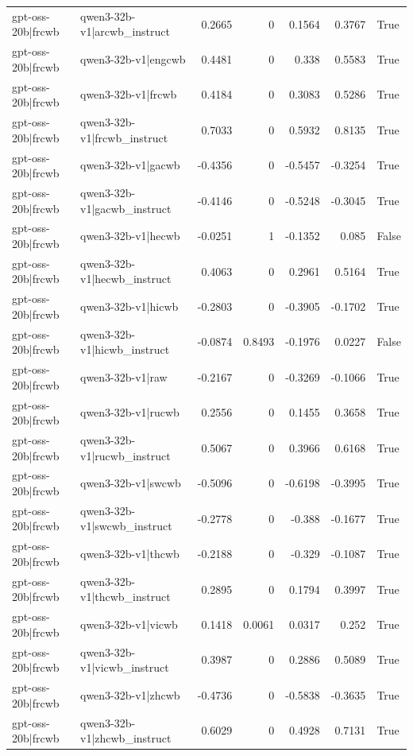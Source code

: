 \begin{table}
\begin{tabular}{l l r r r r l}
gpt-oss-20b|frcwb & qwen3-32b-v1|arcwb_instruct & 0.2665 & 0 & 0.1564 & 0.3767 & True \\
gpt-oss-20b|frcwb & qwen3-32b-v1|engcwb & 0.4481 & 0 & 0.338 & 0.5583 & True \\
gpt-oss-20b|frcwb & qwen3-32b-v1|frcwb & 0.4184 & 0 & 0.3083 & 0.5286 & True \\
gpt-oss-20b|frcwb & qwen3-32b-v1|frcwb_instruct & 0.7033 & 0 & 0.5932 & 0.8135 & True \\
gpt-oss-20b|frcwb & qwen3-32b-v1|gacwb & -0.4356 & 0 & -0.5457 & -0.3254 & True \\
gpt-oss-20b|frcwb & qwen3-32b-v1|gacwb_instruct & -0.4146 & 0 & -0.5248 & -0.3045 & True \\
gpt-oss-20b|frcwb & qwen3-32b-v1|hecwb & -0.0251 & 1 & -0.1352 & 0.085 & False \\
gpt-oss-20b|frcwb & qwen3-32b-v1|hecwb_instruct & 0.4063 & 0 & 0.2961 & 0.5164 & True \\
gpt-oss-20b|frcwb & qwen3-32b-v1|hicwb & -0.2803 & 0 & -0.3905 & -0.1702 & True \\
gpt-oss-20b|frcwb & qwen3-32b-v1|hicwb_instruct & -0.0874 & 0.8493 & -0.1976 & 0.0227 & False \\
gpt-oss-20b|frcwb & qwen3-32b-v1|raw & -0.2167 & 0 & -0.3269 & -0.1066 & True \\
gpt-oss-20b|frcwb & qwen3-32b-v1|rucwb & 0.2556 & 0 & 0.1455 & 0.3658 & True \\
gpt-oss-20b|frcwb & qwen3-32b-v1|rucwb_instruct & 0.5067 & 0 & 0.3966 & 0.6168 & True \\
gpt-oss-20b|frcwb & qwen3-32b-v1|swcwb & -0.5096 & 0 & -0.6198 & -0.3995 & True \\
gpt-oss-20b|frcwb & qwen3-32b-v1|swcwb_instruct & -0.2778 & 0 & -0.388 & -0.1677 & True \\
gpt-oss-20b|frcwb & qwen3-32b-v1|thcwb & -0.2188 & 0 & -0.329 & -0.1087 & True \\
gpt-oss-20b|frcwb & qwen3-32b-v1|thcwb_instruct & 0.2895 & 0 & 0.1794 & 0.3997 & True \\
gpt-oss-20b|frcwb & qwen3-32b-v1|vicwb & 0.1418 & 0.0061 & 0.0317 & 0.252 & True \\
gpt-oss-20b|frcwb & qwen3-32b-v1|vicwb_instruct & 0.3987 & 0 & 0.2886 & 0.5089 & True \\
gpt-oss-20b|frcwb & qwen3-32b-v1|zhcwb & -0.4736 & 0 & -0.5838 & -0.3635 & True \\
gpt-oss-20b|frcwb & qwen3-32b-v1|zhcwb_instruct & 0.6029 & 0 & 0.4928 & 0.7131 & True \\

\end{tabular}
\end{table}
